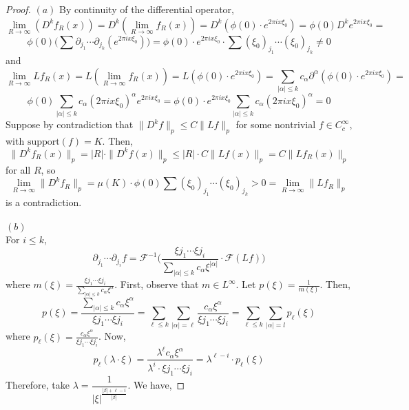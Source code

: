 \documentclass[12pt]{article}
\newenvironment{exercise}[2][Exercise]{\begin{trivlist}
\item[\hskip \labelsep {\bfseries #1}\hskip \labelsep {\bfseries #2.}]}{\end{trivlist}}
\begin{document}
\begin{exercise}{2}
\end{exercise}

\begin{proof}
  $(a)$ By continuity of the differential operator,
  $$
    \lim_{R \rightarrow \infty} (D^k f_R(x)) =
    D^k(\lim_{R \rightarrow \infty} f_R(x)) =
    D^k(\phi(0) \cdot e^{2 \pi i x \xi_0}) =
    \phi(0)  D^k e^{2 \pi i x \xi_0} =
  $$
  $$
    \phi(0) \Big( \sum \partial_{j_1} \cdots \partial_{j_k}(e^{2 \pi i x \xi_0}) \Big) =
    \phi(0) \cdot e^{2 \pi i x \xi_0}  \cdot \sum (\xi_0)_{j_1} \cdots (\xi_0)_{j_k} \ne 0
  $$
  and
  $$
    \lim_{R \rightarrow \infty} L f_R(x) =
    L(\lim_{R \rightarrow \infty} f_R(x)) =
    L(\phi(0) \cdot e^{2 \pi i x \xi_0}) =
    \sum_{|\alpha| \le k}  c_\alpha \partial^\alpha (\phi(0) \cdot e^{2 \pi i x \xi_0}) =
  $$
  $$
    \phi(0) \sum_{|\alpha| \le k}  c_\alpha (2 \pi i x \xi_0)^\alpha e^{2 \pi i x \xi_0}  =
    \phi(0) \cdot e^{2 \pi i x \xi_0} \sum_{|\alpha| \le k}  c_\alpha (2 \pi i x \xi_0)^\alpha =
    0
  $$
  Suppose by contradiction that $\|D^k f\|_p \le C  \|Lf\|_p$ for some nontrivial $f \in C^\infty_c$, with $\text{support}(f) = K$. Then,
  $$
    \|D^k f_R(x)\|_p =
    |R| \cdot \|D^k f(x)\|_p \le
    |R| \cdot C \|Lf(x)\|_p =
    C \|Lf_R(x)\|_p
  $$
  for all $R$, so
  $$
    \lim_{R \rightarrow \infty} \|D^k f_R\|_p =
    \mu(K) \cdot \phi(0) \sum (\xi_0)_{j_1} \cdots (\xi_0)_{j_k} >
    0 =
    \lim_{R \rightarrow \infty} \|Lf_R\|_p
  $$
  is a contradiction.\\\\
  $(b)$\\
  For  $i \le k$,
  $$
    \partial_{j_1} \cdots \partial_{j_i} f =
    \mathcal{F}^{-1}\Big( \dfrac{\xi{j_1} \cdots \xi{j_i}}{\sum_{|\alpha| \le k} c_\alpha \xi^{|\alpha|}} \cdot \mathcal{F}(Lf) \Big)
  $$
  where $m(\xi) = \frac{\xi{j_1} \cdots \xi{j_i}}{\sum_{|\alpha| \le k}c_\alpha \xi^{\alpha}}$. First, observe that $m \in L^\infty$. Let $p(\xi) = \frac{1}{m(\xi)}$. Then,
  $$
    p(\xi) =
    \frac{\sum_{|\alpha| \le k}c_\alpha \xi^{\alpha}}{\xi{j_1} \cdots \xi{j_i}} =
    \sum_{\ell \le k} \sum_{|\alpha| = \ell} \frac{c_\alpha \xi^{\alpha}}{\xi{j_1} \cdots \xi{j_i}} =
    \sum_{\ell \le k} \sum_{|\alpha| = l} p_\ell(\xi)
  $$
  where $p_\ell(\xi) = \frac{c_\alpha \xi^{\alpha}}{\xi{j_1} \cdots \xi{j_i}}$.
  Now,
  $$
    p_\ell(\lambda \cdot \xi) =
    \frac{\lambda^\ell c_\alpha \xi^{\alpha}}{\lambda^i \cdot \xi{j_1} \cdots \xi{j_i}} =
    \lambda^{\ell - i} \cdot p_\ell(\xi)
  $$
  Therefore, take $\lambda = \dfrac{1}{|\xi|^{\frac{|\beta| + \ell -i}{|\beta|}}}$. We have,

\end{proof}
\end{document}
